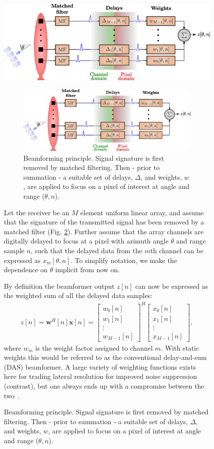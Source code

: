 \documentclass[12pt,journal,draftclsnofoot,onecolumn]{IEEEtran}
\let\MYoriglatexcaption\caption               %
\renewcommand{\caption}[2][\relax]{\MYoriglatexcaption[#2]{#2}}
\newcommand\bmat[1]{\begin{bmatrix}#1\end{bmatrix}}
\renewcommand\H{^{\scriptscriptstyle H}}
\renewcommand\vec[1]{\boldsymbol{#1}}
\newcommand\1{\vec 1}
\newcommand*\w{\vec w}
\newcommand*\x{\vec x}
\begin{document}
\ifPeerReview
\begin{figure}[H]\centering
\includegraphics[width=0.8\linewidth]{gfx/buske1.eps}
\else
\begin{figure}[!t]\centering
\includegraphics[width=\linewidth]{gfx/beamforming.eps}
\fi%
\caption{Beamforming principle. Signal signature is first removed by matched filtering. Then - prior to summation - a suitable set of delays, $\Delta$, and weights, $w$, are applied to focus on a pixel of interest at angle and range ($\theta,n$).}\label{beamforming}
\end{figure}
Let the receiver be an $M$ element uniform linear array, and assume that the signature of the transmitted signal has been removed by a matched filter (Fig. \ref{beamforming}). Further assume that the array channels are digitally delayed to focus at a pixel with azimuth angle $\theta$ and range sample $n$, such that the delayed data from the $m$th channel can be expressed as $x_m[\theta,n]$. To simplify notation, we make the dependence on $\theta$ implicit from now on. 

By definition the beamformer output $z[n]$ can now be expressed as the weighted sum of all the delayed data samples:
\begin{align}
z[n] = \w\H[n]\x[n] = \bmat{w_0[n]\\w_1[n]\\\vdots\\w_{M-1}[n]}^H \bmat{x_0[n]\\x_1[n]\\\vdots\\x_{M-1}[n]},\label{z}
\end{align}
where $w_m$ is the weight factor assigned to channel $m$. With static weights this would be referred to as the conventional delay-and-sum (DAS) beamformer. A large variety of weighting functions exists here for trading lateral resolution for improved noise suppression (contrast), but one always ends up with a compromise between the two~\cite{Harris1978}.


\end{figure}
\end{document}
